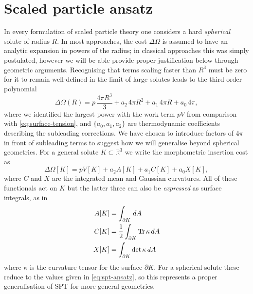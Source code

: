\documentclass[11pt,twoside]{report}
\begin{document}
\section{Scaled particle ansatz}
\label{sec:morphometric-approach}

In every formulation of scaled particle theory one considers a hard \emph{spherical} solute of radius $R$.
In most approaches, the cost $\Delta \Omega$ is assumed to have an analytic expansion in powers of the radius; in classical approaches this was simply postulated, however we will be able provide proper justification below through geometric arguments.
Recognising that terms scaling faster than $R^3$ must be zero for it to remain well-defined in the limit of large solutes leads to the third order polynomial \cite{ReissJCP1959}
\begin{equation}\label{eq:spt-ansatz}
  \Delta\Omega(R) =
  p \, \frac{4\pi R^3}{3} + a_2 \, 4 \pi R^2 + a_1 \, 4 \pi R + a_0 \, 4 \pi,
\end{equation}
where we identified the largest power with the work term $pV$ from comparison with \eqref{eq:surface-tension}, and $\{a_0, a_1, a_2\}$ are thermodynamic coefficients describing the subleading corrections.
We have chosen to introduce factors of $4\pi$ in front of subleading terms to suggest how we will generalise beyond spherical geometries.
For a general solute $K \subset \mathbb{R}^3$ we write the morphometric insertion cost as
\begin{equation}\label{eq:morph-ansatz}
  \Delta\Omega[K] =
  p V[K]
  + a_2 A[K]
  + a_1 C[K]
  + a_0 X[K],
\end{equation}
where $C$ and $X$ are the integrated mean and Gaussian curvatures.
All of these functionals act on $K$ but the latter three can also be \emph{expressed} as surface integrals, as in
\begin{subequations}
  \begin{align}
    A[K]
    &=
    \int_{\partial K} \, dA
    \\
    C[K]
    &=
    \frac{1}{2} \int_{\partial K} \operatorname*{Tr}{\kappa} \, dA
    \\
    X[K]
    &=
    \int_{\partial K} \det{\kappa} \, dA
  \end{align}
\end{subequations}
where $\kappa$ is the curvature tensor for the surface $\partial K$.
For a spherical solute these reduce to the values given in \eqref{eq:spt-ansatz}, so this represents a proper generalisation of SPT for more general geometries.
\end{document}

